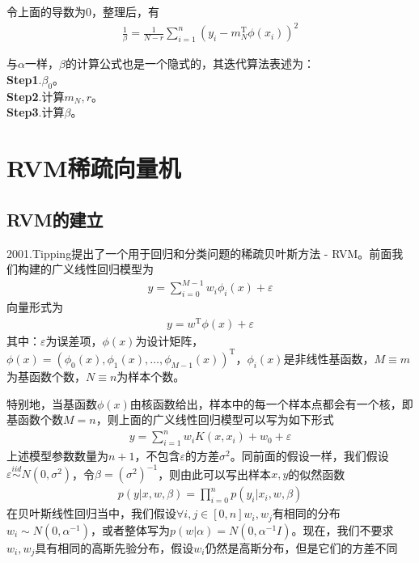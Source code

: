         令上面的导数为0，整理后，有
        \begin{align*}
        \frac{1}{\beta} = \frac{1}{N -r} \sum_{i=1}^n \left( y_i - m_N^\mathrm{T}\phi(x_i) \right) ^2
        \end{align*}
        \par
        与$\alpha$一样，$\beta$的计算公式也是一个隐式的，其迭代算法表述为：\\
        \textbf{Step1}.$\beta_0$。\\
        \textbf{Step2}.计算$m_N,r$。\\
        \textbf{Step3}.计算$\beta$。

\section{RVM稀疏向量机}
    \subsection{RVM的建立}
        \par
        2001.Tipping\cite{2001.Tipping}提出了一个用于回归和分类问题的稀疏贝叶斯方法 - RVM\cite{张贤达.2012}。前面我们构建的广义线性回归模型为
        \begin{align*}
        y = \sum_{i = 0}^{M-1}w_i \phi_i(x) + \varepsilon
        \end{align*}
        向量形式为
        \begin{align*}
        y = w^\mathrm{T}\phi(x)+\varepsilon
        \end{align*}
        其中：$\varepsilon$为误差项，$\phi(x)$为设计矩阵，$\phi(x)= (\phi_0(x),\phi_1(x),\dots,\phi_{M-1}(x))^\mathrm{T}$，$\phi_i(x)$是非线性基函数，$M \equiv m$为基函数个数，$N \equiv n$为样本个数。
        \par
        特别地，当基函数$\phi(x)$由核函数给出，样本中的每一个样本点都会有一个核，即基函数个数$M = n$，则上面的广义线性回归模型可以写为如下形式
        \begin{align*}
        y = \sum_{i = 1}^n w_i K(x,x_i)+w_0 +\varepsilon
        \end{align*}
        上述模型参数数量为$n+1$，不包含$\varepsilon$的方差$\sigma^2$。同前面的假设一样，我们假设$\varepsilon \overset{iid}{\sim} N(0,\sigma^2)$，令$\beta = (\sigma^2)^{-1}$，则由此可以写出样本$x,y$的似然函数
        \begin{align*}
        p(y|x,w,\beta) = \prod_{i=0}^n p(y_i|x_i,w,\beta)
        \end{align*}
        在贝叶斯线性回归当中，我们假设$\forall i,j \in [0,n]w_i,w_j$有相同的分布$w_i \sim N(0,\alpha^{-1})$，或者整体写为$p(w|\alpha) = N(0,\alpha^{-1}I)$。现在，我们不要求$w_i,w_j$具有相同的高斯先验分布，假设$w_i$仍然是高斯分布，但是它们的方差不同
